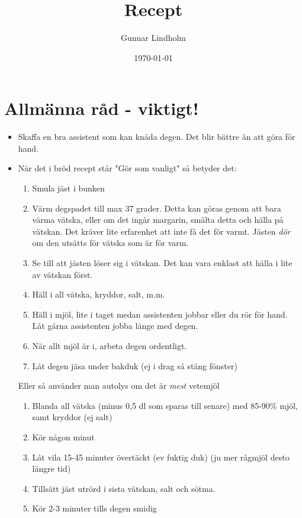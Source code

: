 \documentclass[a4paper,11pt,twocolumn]{article}
\title{Recept}
\author{Gunnar Lindholm}
\date{\today}
\begin{document}
\maketitle
\thispagestyle{empty}

\clearpage
\begingroup
\small
\tableofcontents
\thispagestyle{empty}
\endgroup
\clearpage

\section{Allmänna råd - viktigt!}
\begin{itemize}
    \item Skaffa en bra assistent som kan knåda degen. Det blir bättre än att göra för hand.
    \item När det i bröd recept står "Gör som vanligt" så betyder det:
    \begin{enumerate}
        \item Smula jäst i bunken
        \item Värm degspadet till max 37 grader. Detta kan göras genom att bara värma vätska, eller om det ingår margarin, smälta detta och hälla på vätskan. Det kräver lite erfarenhet att inte få det för varmt. Jästen \emph{dör} om den utsätts för vätska som är för varm.
        \item Se till att jästen löser sig i vätskan. Det kan vara enklast att hälla i lite av vätskan först.
        \item Häll i all vätska, kryddor, salt, m.m.
        \item Häll i mjöl, lite i taget medan assistenten jobbar eller du rör för hand. Låt gärna assistenten jobba länge med degen.
        \item När allt mjöl är i, arbeta degen ordentligt.
        \item Låt degen jäsa under bakduk (ej i drag så stäng fönster)
    \end{enumerate}
    Eller så använder man autolys om det är \emph{mest} vetemjöl
    \begin{enumerate}
        \item Blanda all vätska (minus 0,5 dl som sparas till senare) med 85-90\% mjöl, samt kryddor (ej salt)
        \item Kör någon minut
        \item Låt vila 15-45 minuter övertäckt (ev fuktig duk) (ju mer rågmjöl desto längre tid)
        \item Tillsätt jäst utrörd i sista vätskan, salt och sötma.
        \item Kör 2-3 minuter tills degen smidig

\end{enumerate}
\end{itemize}
\end{document}
